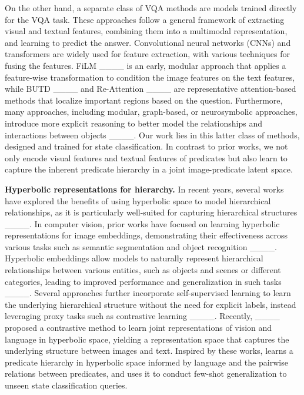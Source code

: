 On the other hand, a separate class of VQA methods are models trained directly for the VQA task. These approaches follow a general framework of extracting visual and textual features, combining them into a multimodal representation, and learning to predict the answer. Convolutional neural networks (CNNs) and transformers are widely used for feature extraction, with various techniques for fusing the features. FiLM ____ is an early, modular approach that applies a feature-wise transformation to condition the image features on the text features, while BUTD ____ and Re-Attention ____ are representative attention-based methods that localize important regions based on the question. Furthermore, many approaches, including modular, graph-based, or neurosymbolic approaches, introduce more explicit reasoning to better model the relationships and interactions between objects ____. Our work lies in this latter class of methods, designed and trained for state classification. In contrast to prior works, we not only encode visual features and textual features of predicates but also learn to capture the inherent predicate hierarchy in a joint image-predicate latent space.

\vspace{-0.1cm}
\textbf{Hyperbolic representations for hierarchy.}
In recent years, several works have explored the benefits of using hyperbolic space to model hierarchical relationships, as it is particularly well-suited for capturing hierarchical structures ____. In computer vision, prior works have focused on learning hyperbolic representations for image embeddings, demonstrating their effectiveness across various tasks such as semantic segmentation and object recognition ____. Hyperbolic embeddings allow models to naturally represent hierarchical relationships between various entities, such as objects and scenes or different categories, leading to improved performance and generalization in such tasks ____. Several approaches further incorporate self-supervised learning to learn the underlying hierarchical structure without the need for explicit labels, instead leveraging proxy tasks such as contrastive learning ____. Recently, ____ proposed a contrastive method to learn joint representations of vision and language in hyperbolic space, yielding a representation space that captures the underlying structure between images and text. Inspired by these works, \model learns a predicate hierarchy in hyperbolic space informed by language and the pairwise relations between predicates, and uses it to conduct few-shot generalization to unseen state classification queries. 
%
%